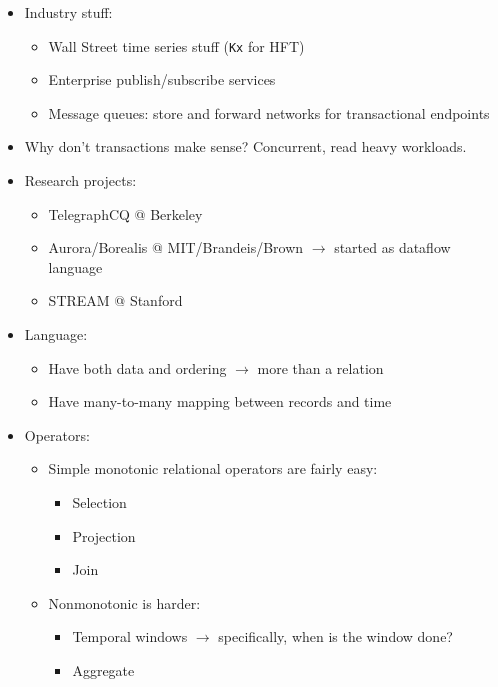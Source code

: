\documentclass[10pt]{article}
\begin{document}
\begin{itemize}
\item Industry stuff:
\begin{itemize}
\item Wall Street time series stuff (\texttt{Kx} for HFT)
\item Enterprise publish/subscribe services
\item Message queues: store and forward networks for transactional endpoints
\end{itemize}
\item Why don't transactions make sense? Concurrent, read heavy workloads.
\item Research projects:
\begin{itemize}
\item TelegraphCQ @ Berkeley
\item Aurora/Borealis @ MIT/Brandeis/Brown $\rightarrow$ started as dataflow language
\item STREAM @ Stanford
\end{itemize}
\item Language:
\begin{itemize}
\item Have both data and ordering $\rightarrow$ more than a relation
\item Have many-to-many mapping between records and time
\end{itemize}
\item Operators:
\begin{itemize}
\item Simple monotonic relational operators are fairly easy:
\begin{itemize}
\item Selection
\item Projection
\item Join
\end{itemize}
\item Nonmonotonic is harder:
\begin{itemize}
\item Temporal windows $\rightarrow$ specifically, when is the window done?
\item Aggregate
\end{itemize}
\end{itemize}
\end{itemize}
\end{document}
